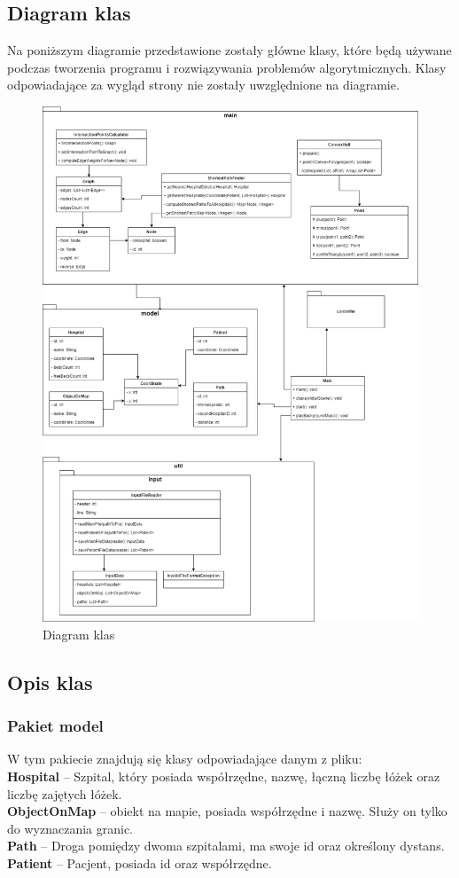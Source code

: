 \documentclass{article}
\begin{document}
\subsection{Diagram klas}
Na poniższym diagramie przedstawione zostały główne klasy, które będą używane podczas tworzenia programu i rozwiązywania problemów algorytmicznych. Klasy odpowiadające za wygląd strony nie zostały uwzględnione na diagramie.
\begin{figure}[H]
  \centering
  \includegraphics[width=12cm]{diagram.png}
  \caption{Diagram klas}
  \label{}
\end{figure}
\subsection{Opis klas}
\subsubsection{Pakiet model}
W tym pakiecie znajdują się klasy odpowiadające danym z pliku:\\
\textbf{Hospital} -- Szpital, który posiada współrzędne, nazwę, łączną liczbę łóżek oraz liczbę zajętych łóżek.\\
\textbf{ObjectOnMap} -- obiekt na mapie, posiada współrzędne i nazwę. Służy on tylko do wyznaczania granic.\\
\textbf{Path} -- Droga pomiędzy dwoma szpitalami, ma swoje id oraz określony dystans.\\
\textbf{Patient} -- Pacjent, posiada id oraz współrzędne.\\
\end{document}
